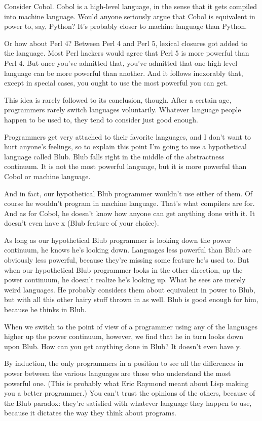 Consider Cobol. Cobol is a high-level language, in the sense that it
gets compiled into machine language. Would anyone seriously argue that
Cobol is equivalent in power to, say, Python? It's probably closer to
machine language than Python.

Or how about Perl 4? Between Perl 4 and Perl 5, lexical closures got
added to the language. Most Perl hackers would agree that Perl 5 is more
powerful than Perl 4. But once you've admitted that, you've admitted
that one high level language can be more powerful than another. And it
follows inexorably that, except in special cases, you ought to use the
most powerful you can get.

This idea is rarely followed to its conclusion, though. After a certain
age, programmers rarely switch languages voluntarily. Whatever language
people happen to be used to, they tend to consider just good enough.

Programmers get very attached to their favorite languages, and I don't
want to hurt anyone's feelings, so to explain this point I'm going to
use a hypothetical language called Blub. Blub falls right in the middle
of the abstractness continuum. It is not the most powerful language, but
it is more powerful than Cobol or machine language.

And in fact, our hypothetical Blub programmer wouldn't use either of
them. Of course he wouldn't program in machine language. That's what
compilers are for. And as for Cobol, he doesn't know how anyone can get
anything done with it. It doesn't even have x (Blub feature of your
choice).

As long as our hypothetical Blub programmer is looking down the power
continuum, he knows he's looking down. Languages less powerful than Blub
are obviously less powerful, because they're missing some feature he's
used to. But when our hypothetical Blub programmer looks in the other
direction, up the power continuum, he doesn't realize he's looking up.
What he sees are merely weird languages. He probably considers them
about equivalent in power to Blub, but with all this other hairy stuff
thrown in as well. Blub is good enough for him, because he thinks in
Blub.

When we switch to the point of view of a programmer using any of the
languages higher up the power continuum, however, we find that he in
turn looks down upon Blub. How can you get anything done in Blub? It
doesn't even have y.

By induction, the only programmers in a position to see all the
differences in power between the various languages are those who
understand the most powerful one. (This is probably what Eric Raymond
meant about Lisp making you a better programmer.) You can't trust the
opinions of the others, because of the Blub paradox: they're satisfied
with whatever language they happen to use, because it dictates the way
they think about programs.

